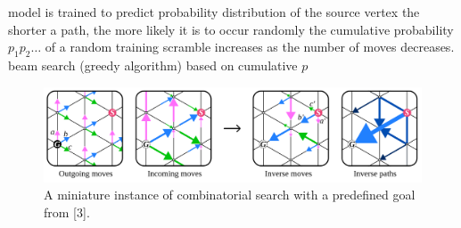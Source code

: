 
\vspace{-5mm}
\begin{itemize}
	\iitem model is trained to predict probability distribution of the source vertex
	\iitem the shorter a path, the more likely it is to occur randomly
	\iitem the cumulative probability $p_1 p_2 \ldots$ of a random training scramble increases as the number of moves decreases.
	\iitem beam search (greedy algorithm) based on cumulative $p$
\end{itemize}


\begin{figure}[h]
    \centering
    \includegraphics[width=1.0\textwidth]{imgs/unscrambling.png}
    \caption{A miniature instance of combinatorial search with a predefined goal from [3].}
\end{figure}


